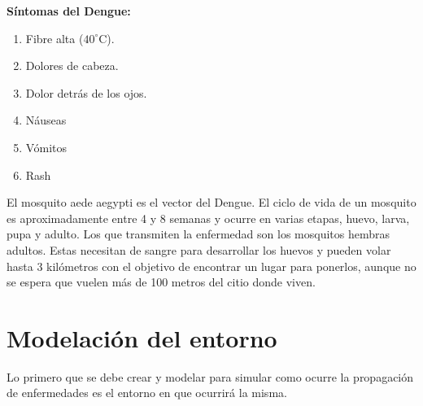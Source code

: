\textbf{Síntomas del Dengue:}\autocite{OMS2023}
\begin{enumerate}
    \item Fibre alta ($40^{\circ}$C).
    \item Dolores de cabeza.
    \item Dolor detrás de los ojos.
    \item Náuseas
    \item Vómitos
    \item Rash
\end{enumerate}

El mosquito aede aegypti es el vector del Dengue. El ciclo de vida de un mosquito es aproximadamente entre 4 y 
8 semanas y ocurre en varias etapas, huevo, larva, pupa y adulto. Los que transmiten la enfermedad son los mosquitos
hembras adultos. Estas necesitan de sangre para desarrollar los huevos y pueden volar hasta 3 kilómetros con 
el objetivo de encontrar un lugar para ponerlos, aunque no se espera que vuelen más de 100 metros del citio 
donde viven.\\

\section{Modelación del entorno}
Lo primero que se debe crear y modelar para simular como ocurre la propagación de enfermedades es el 
entorno en que ocurrirá la misma. 








